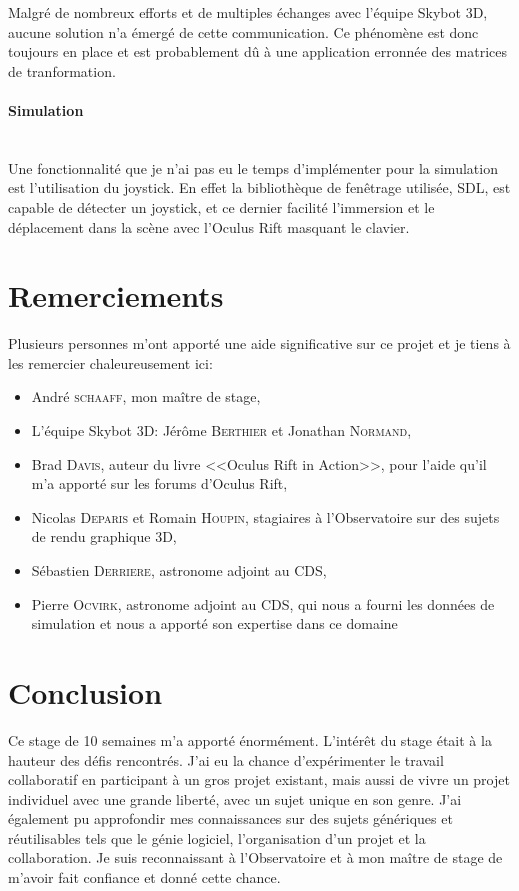 \documentclass[a4paper,french,12pt]{article}
\begin{document}
	Malgré de nombreux efforts et de multiples échanges avec l'équipe Skybot 3D, aucune solution n'a émergé de 
	cette communication. Ce phénomène est donc toujours en place et est probablement dû à une application erronnée
	des matrices de tranformation.
	
      \paragraph{Simulation}~\\
	Une fonctionnalité que je n'ai pas eu le temps d'implémenter pour la simulation est l'utilisation du joystick.
	En effet la bibliothèque de fenêtrage utilisée, SDL, est capable de détecter un joystick, et ce dernier 
	facilité l'immersion et le déplacement dans la scène avec l'Oculus Rift masquant le clavier.
	
	
		
\section{Remerciements}

	Plusieurs personnes m’ont apporté une aide significative sur ce projet et je tiens à les remercier chaleureusement ici: 

	\begin{itemize}
	\item André \textsc{schaaff}, mon maître de stage,
	\item L'équipe Skybot 3D: Jérôme \textsc{Berthier} et Jonathan \textsc{Normand},
	\item Brad \textsc{Davis}, auteur du livre <<Oculus Rift in Action>>, pour l'aide qu'il m'a apporté sur les forums d'Oculus Rift,
	\item Nicolas \textsc{Deparis} et Romain \textsc{Houpin}, stagiaires à l'Observatoire sur des sujets de rendu graphique 3D,
	\item Sébastien \textsc{Derriere}, astronome adjoint au CDS,
	\item Pierre \textsc{Ocvirk}, astronome adjoint au CDS, qui nous a fourni les données de simulation et nous a apporté son expertise dans ce domaine
	\end{itemize}

\section{Conclusion}


	Ce stage de 10 semaines m'a apporté énormément. L'intérêt du stage était à la hauteur des défis rencontrés.
	J'ai eu la chance d'expérimenter le travail collaboratif en participant à un gros projet existant, mais aussi 
	de vivre un projet individuel avec une grande liberté, avec un sujet unique en son genre.
	J'ai également pu approfondir mes connaissances sur des sujets génériques et réutilisables tels que le génie logiciel,
	l'organisation d'un projet et la collaboration.
	Je suis reconnaissant à l'Observatoire et à mon maître de stage de m'avoir fait confiance et donné cette chance.
	
\end{document}

